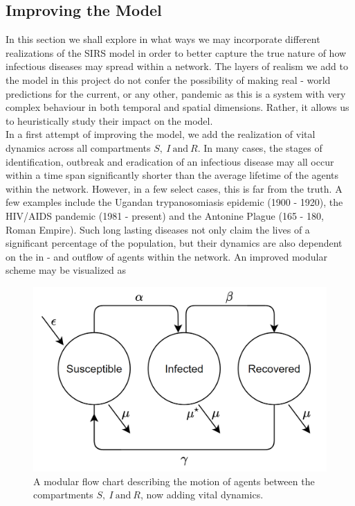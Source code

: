 \subsection{Improving the Model}\label{improvingmodel}
In this section we shall explore in what ways we may incorporate different realizations of the SIRS model in order to better capture the true nature of how infectious diseases may spread within a network. The layers of realism we add to the model in this project do not confer the possibility of making real - world predictions for the current, or any other, pandemic as this is a system with very complex behaviour in both temporal and spatial dimensions. Rather, it allows us to heuristically study their impact on the model.\\

In a first attempt of improving the model, we add the realization of vital dynamics across all compartments $S, \ I \ \text{and}\ R$. In many cases, the stages of  identification, outbreak and eradication of an infectious disease may all occur within a time span significantly shorter than the average lifetime of the agents within the network. However, in a few select cases, this is far from the truth. A few examples include the Ugandan trypanosomiasis epidemic (1900 - 1920)\cite{uganda}, the HIV/AIDS pandemic (1981 - present) and the Antonine Plague (165 - 180, Roman Empire)\cite{historypandemics}. Such long lasting diseases not only claim the lives of a significant percentage of the population, but their dynamics are also dependent on the in - and outflow of agents within the network. An improved modular scheme may be visualized as
\begin{figure}[H]
    \centering
    \includegraphics{Figures/SIRVITAL.PNG}
    \caption{A modular flow chart describing the motion of agents between the compartments $S, \ I\ \text{and}\ R$, now adding vital dynamics.}
    \label{SIRVITALCHART}
\end{figure}
